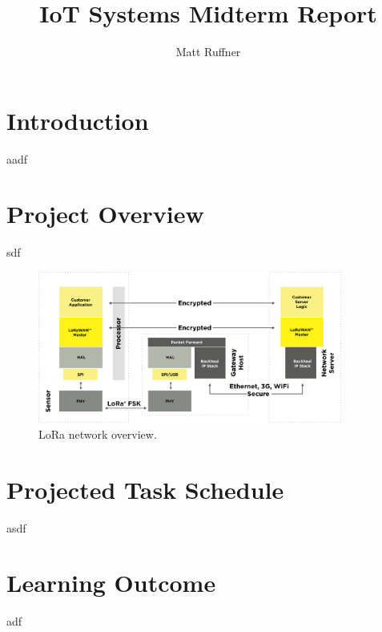 \documentclass{IEEEtran}
\title{IoT Systems Midterm Report}
\author{Matt Ruffner}
\date{}
\begin{document}
\maketitle


\section{Introduction}
aadf

\section{Project Overview} 
sdf

\begin{figure}
    \centering
    \includegraphics[width=10cm]{images/lorasystem.svg}
    \caption{LoRa network overview.}
    \label{fig:lora_overview}
\end{figure}
\section{Projected Task Schedule} 
asdf

\section{Learning Outcome}
adf



\end{document}
